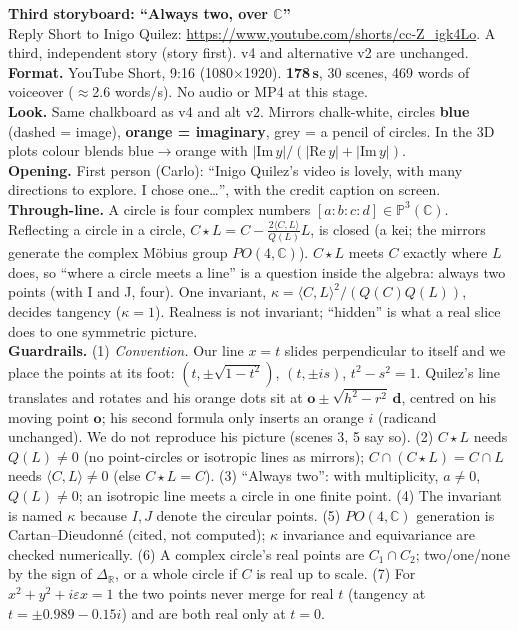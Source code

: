 \documentclass[10pt]{article}
\begin{document}
{\LARGE\bfseries Third storyboard: ``Always two, over $\mathbb C$''}\\[3pt]
Reply Short to Inigo Quilez: \url{https://www.youtube.com/shorts/cc-Z_igk4Lo}. A third, independent story (story first). v4 and alternative v2 are unchanged.\\[6pt]
\textbf{Format.} YouTube Short, 9:16 (1080$\times$1920). \textbf{178\,s}, 30 scenes, 469 words of voiceover ($\approx$2.6 words/s). No audio or MP4 at this stage.\\
\textbf{Look.} Same chalkboard as v4 and alt v2. Mirrors chalk-white, circles \textcolor[HTML]{4DA3FF}{\textbf{blue}} (dashed = image), \textcolor[HTML]{FF9A3C}{\textbf{orange = imaginary}}, grey = a pencil of circles. In the 3D plots colour blends blue$\to$orange with $|\mathrm{Im}\,y|/(|\mathrm{Re}\,y|+|\mathrm{Im}\,y|)$.\\
\textbf{Opening.} First person (Carlo): ``Inigo Quilez's video is lovely, with many directions to explore. I chose one\ldots'', with the credit caption on screen.\\
\textbf{Through-line.} A circle is four complex numbers $[a:b:c:d]\in\mathbb P^3(\mathbb C)$. Reflecting a circle in a circle, $C\star L=C-\tfrac{2\langle C,L\rangle}{Q(L)}L$, is closed (a kei; the mirrors generate the complex Möbius group $PO(4,\mathbb C)$). $C\star L$ meets $C$ exactly where $L$ does, so ``where a circle meets a line'' is a question inside the algebra: always two points (with I and J, four). One invariant, $\kappa=\langle C,L\rangle^2/(Q(C)Q(L))$, decides tangency ($\kappa=1$). Realness is not invariant; ``hidden'' is what a real slice does to one symmetric picture.\\[4pt]
\textbf{Guardrails.} (1) \emph{Convention.} Our line $x=t$ slides perpendicular to itself and we place the points at its foot: $(t,\pm\sqrt{1-t^2})$, $(t,\pm is)$, $t^2-s^2=1$. Quilez's line translates and rotates and his orange dots sit at $\mathbf o\pm\sqrt{h^2-r^2}\,\mathbf d$, centred on his moving point $\mathbf o$; his second formula only inserts an orange $i$ (radicand unchanged). We do not reproduce his picture (scenes 3, 5 say so). (2) $C\star L$ needs $Q(L)\neq0$ (no point-circles or isotropic lines as mirrors); $C\cap(C\star L)=C\cap L$ needs $\langle C,L\rangle\neq0$ (else $C\star L=C$). (3) ``Always two'': with multiplicity, $a\neq0$, $Q(L)\neq0$; an isotropic line meets a circle in one finite point. (4) The invariant is named $\kappa$ because $I,J$ denote the circular points. (5) $PO(4,\mathbb C)$ generation is Cartan--Dieudonné (cited, not computed); $\kappa$ invariance and equivariance are checked numerically. (6) A complex circle's real points are $C_1\cap C_2$; two/one/none by the sign of $\Delta_{\mathbb R}$, or a whole circle if $C$ is real up to scale. (7) For $x^2+y^2+i\varepsilon x=1$ the two points never merge for real $t$ (tangency at $t=\pm0.989-0.15i$) and are both real only at $t=0$.\\[4pt]
\end{document}
